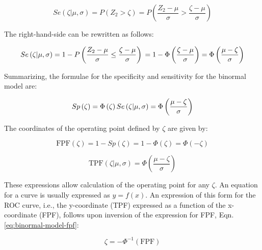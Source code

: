 \documentclass[
]{book}
\begin{document}
\begin{equation} 
Se\left ( \zeta | \mu, \sigma \right )= P\left ( Z_2 > \zeta \right )=P\left ( \frac{Z_2-\mu}{\sigma} > \frac{\zeta-\mu}{\sigma} \right )
\label{eq:binormal-model-sensitivity}
\end{equation}

The right-hand-side can be rewritten as follows:

\begin{equation*} 
Se\left ( \zeta | \mu, \sigma \right )= 1 - P\left ( \frac{Z_2-\mu}{\sigma} \leq  \frac{\zeta-\mu}{\sigma} \right )\\
=1-\Phi\left (  \frac{\zeta-\mu}{\sigma}\right )=\Phi\left (  \frac{\mu-\zeta}{\sigma}\right )
\end{equation*}

Summarizing, the formulae for the specificity and sensitivity for the binormal model are:

\begin{equation} 
Sp\left ( \zeta \right ) = \Phi\left ( \zeta \right )\\
Se\left ( \zeta | \mu, \sigma \right ) = \Phi\left (  \frac{\mu-\zeta}{\sigma}\right )
\label{eq:binormal-model-sensitivitySp}
\end{equation}

The coordinates of the operating point defined by \(\zeta\) are given by:

\begin{equation} 
\text{FPF}\left ( \zeta \right ) = 1 - Sp\left ( \zeta \right ) = 1 - \Phi\left ( \zeta \right ) = \Phi\left ( -\zeta \right )
\label{eq:binormal-model-fpf}
\end{equation}

\begin{equation} 
\text{TPF}\left ( \zeta | \mu, \sigma \right ) = \Phi\left ( \frac{\mu-\zeta}{\sigma} \right )
\label{eq:binormal-model-tpf}
\end{equation}

These expressions allow calculation of the operating point for any \(\zeta\). An equation for a curve is usually expressed as \(y=f(x)\). An expression of this form for the ROC curve, i.e., the y-coordinate (TPF) expressed as a function of the x-coordinate (FPF), follows upon inversion of the expression for FPF, Eqn. \eqref{eq:binormal-model-fpf}:

\begin{equation} 
\zeta = -\Phi^{-1}\left ( \text{FPF} \right )
\label{eq:binormal-model-zeta}
\end{equation}
\end{document}
